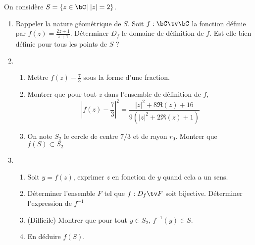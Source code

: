 




\begin{exercice}
On considère $ S= \{ z\in \bC\, | \, |z|=2\}$.
\begin{enumerate}
\item Rappeler la nature géométrique de $S$.
Soit $f : \bC \tv \bC $ la fonction définie par $f(z) =\frac{2z +1}{z+1}$. Déterminer $D_f$ le domaine de définition de $f$. Est elle bien définie pour tous les points de $S$ ? 
\item 
\begin{enumerate}
\item Mettre $f(z) -\frac{7}{3}$ sous la forme d'une fraction. 
\item Montrer que pour tout $z$ dans l'ensemble de définition de $f$, $$\left| f(z) -\frac{7}{3}\right|^2 = \frac{|z|^2 +8\Re(z) +16 }{9 (|z|^2 +2\Re(z) +1)}$$
\item On note $S_2$ le cercle de centre $7/3$ et de rayon $r_0$. Montrer que $f(S) \subset S_2$
\end{enumerate}
\item
\begin{enumerate}
\item  Soit $y =f(z)$, exprimer $z$ en fonction de $y$ quand cela a un sens. 
\item Déterminer l'ensemble $F$ tel que $f : D_f \tv F$ soit bijective. Déterminer l'expression de $f^{-1}$ 
\item (Difficile) Montrer que pour tout $y\in S_2$, $f^{-1}(y) \in S$. 
\item En déduire $f(S).$ 
\end{enumerate}

\end{enumerate}
\end{exercice}

